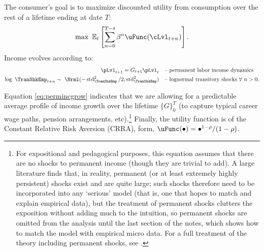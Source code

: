 \documentclass[titlepage, headings=optiontotocandhead]{Resources/texmf-local/tex/latex/econtex}
\begin{document}
The consumer's goal is to maximize discounted utility from consumption over the rest of a lifetime ending at date $T$:
  \begin{equation}\label{eq:MaxProb}
    \max~\Ex_{t}\left[\sum_{n=0}^{T-t}\beta^{n} \uFunc(\cLvl_{t+n})\right].
  \end{equation}
Income evolves according to:
  \begin{equation}\begin{gathered}\begin{aligned}
        \pLvl_{t+1}   = G_{t+1}\pLvl_{t}                                        & \text{~~ -- permanent labor income dynamics} \label{eq:permincgrow}
        \\ \log ~ \TranShkEmp_{t+n}  \sim ~\Nrml(-\std_{\TranShkEmp}^{2}/2,\std_{\TranShkEmp}^{2}) & \text{~~ -- lognormal transitory shocks}~\forall~n>0 .
      \end{aligned}\end{gathered}\end{equation}

Equation \eqref{eq:permincgrow} indicates that we are allowing for a predictable average profile of income growth over the lifetime $\{G\}_{0}^{T}$ (to capture typical career wage paths, pension arrangements, etc).\footnote{For expositional and pedagogical purposes, this equation assumes that there are no shocks to permanent income (though they are trivial to add).  A large literature finds that, in reality, permanent (or at least extremely highly persistent) shocks exist and are quite large; such shocks therefore need to be incorporated into any `serious' model (that is, one that hopes to match and explain empirical data), but the treatment of permanent shocks clutters the exposition without adding much to the intuition, so permanent shocks are omitted from the analysis until the last section of the notes, which shows how to match the model with empirical micro data.  For a full treatment of the theory including permanent shocks, see \cite{BufferStockTheory}.}  Finally, the utility function is of the Constant Relative Risk Aversion (CRRA), form, $\uFunc(\bullet) = \bullet^{1-\rho}/(1-\rho)$.
\end{document}
